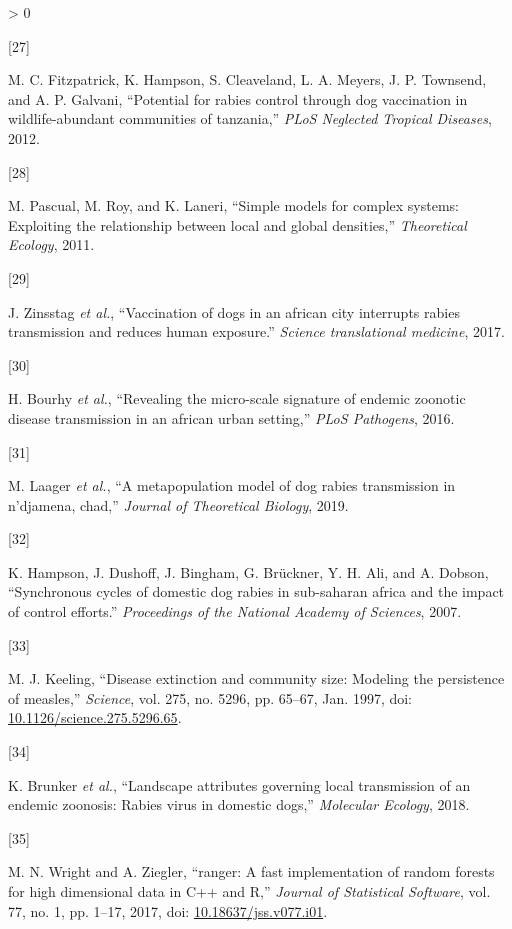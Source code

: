 \documentclass[
  oneside]{book}
\newlength{\cslhangindent}
\newlength{\csllabelwidth}
\newenvironment{CSLReferences}[2] %
 {%
  \setlength{\parindent}{0pt}
  \ifodd #1 \everypar{\setlength{\hangindent}{\cslhangindent}}\ignorespaces\fi
  \ifnum #2 > 0
  \setlength{\parskip}{#2\baselineskip}
  \fi
 }%
 {}
\newcommand{\CSLLeftMargin}[1]{\parbox[t]{\csllabelwidth}{#1}}
\newcommand{\CSLRightInline}[1]{\parbox[t]{\linewidth - \csllabelwidth}{#1}\break}
\begin{document}
\begin{CSLReferences}{0}{0}
\leavevmode\hypertarget{ref-fitzpatrick2012}{}%
\CSLLeftMargin{{[}27{]} }
\CSLRightInline{M. C. Fitzpatrick, K. Hampson, S. Cleaveland, L. A. Meyers, J. P. Townsend, and A. P. Galvani, {``Potential for rabies control through dog vaccination in wildlife-abundant communities of tanzania,''} \emph{PLoS Neglected Tropical Diseases}, 2012.}

\leavevmode\hypertarget{ref-pascual2011}{}%
\CSLLeftMargin{{[}28{]} }
\CSLRightInline{M. Pascual, M. Roy, and K. Laneri, {``Simple models for complex systems: Exploiting the relationship between local and global densities,''} \emph{Theoretical Ecology}, 2011.}

\leavevmode\hypertarget{ref-zinsstag2017}{}%
\CSLLeftMargin{{[}29{]} }
\CSLRightInline{J. Zinsstag \emph{et al.}, {``Vaccination of dogs in an african city interrupts rabies transmission and reduces human exposure.''} \emph{Science translational medicine}, 2017.}

\leavevmode\hypertarget{ref-bourhy2016}{}%
\CSLLeftMargin{{[}30{]} }
\CSLRightInline{H. Bourhy \emph{et al.}, {``Revealing the micro-scale signature of endemic zoonotic disease transmission in an african urban setting,''} \emph{PLoS Pathogens}, 2016.}

\leavevmode\hypertarget{ref-laager2019}{}%
\CSLLeftMargin{{[}31{]} }
\CSLRightInline{M. Laager \emph{et al.}, {``A metapopulation model of dog rabies transmission in n'djamena, chad,''} \emph{Journal of Theoretical Biology}, 2019.}

\leavevmode\hypertarget{ref-hampson2007}{}%
\CSLLeftMargin{{[}32{]} }
\CSLRightInline{K. Hampson, J. Dushoff, J. Bingham, G. Brückner, Y. H. Ali, and A. Dobson, {``Synchronous cycles of domestic dog rabies in sub-saharan africa and the impact of control efforts.''} \emph{Proceedings of the National Academy of Sciences}, 2007.}

\leavevmode\hypertarget{ref-keeling1997}{}%
\CSLLeftMargin{{[}33{]} }
\CSLRightInline{M. J. Keeling, {``Disease extinction and community size: Modeling the persistence of measles,''} \emph{Science}, vol. 275, no. 5296, pp. 65--67, Jan. 1997, doi: \href{https://doi.org/10.1126/science.275.5296.65}{10.1126/science.275.5296.65}.}

\leavevmode\hypertarget{ref-brunker2018}{}%
\CSLLeftMargin{{[}34{]} }
\CSLRightInline{K. Brunker \emph{et al.}, {``Landscape attributes governing local transmission of an endemic zoonosis: Rabies virus in domestic dogs,''} \emph{Molecular Ecology}, 2018.}

\leavevmode\hypertarget{ref-ranger2017}{}%
\CSLLeftMargin{{[}35{]} }
\CSLRightInline{M. N. Wright and A. Ziegler, {``{ranger}: A fast implementation of random forests for high dimensional data in {C++} and {R},''} \emph{Journal of Statistical Software}, vol. 77, no. 1, pp. 1--17, 2017, doi: \href{https://doi.org/10.18637/jss.v077.i01}{10.18637/jss.v077.i01}.}


\end{CSLReferences}
\end{document}
